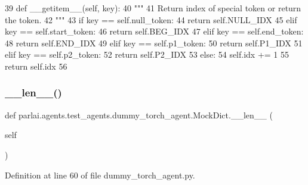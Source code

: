 \begin{DoxyCode}
39     \textcolor{keyword}{def }\_\_getitem\_\_(self, key):
40         \textcolor{stringliteral}{"""}
41 \textcolor{stringliteral}{        Return index of special token or return the token.}
42 \textcolor{stringliteral}{        """}
43         \textcolor{keywordflow}{if} key == self.null\_token:
44             \textcolor{keywordflow}{return} self.NULL\_IDX
45         \textcolor{keywordflow}{elif} key == self.start\_token:
46             \textcolor{keywordflow}{return} self.BEG\_IDX
47         \textcolor{keywordflow}{elif} key == self.end\_token:
48             \textcolor{keywordflow}{return} self.END\_IDX
49         \textcolor{keywordflow}{elif} key == self.p1\_token:
50             \textcolor{keywordflow}{return} self.P1\_IDX
51         \textcolor{keywordflow}{elif} key == self.p2\_token:
52             \textcolor{keywordflow}{return} self.P2\_IDX
53         \textcolor{keywordflow}{else}:
54             self.idx += 1
55             \textcolor{keywordflow}{return} self.idx
56 
\end{DoxyCode}
\mbox{\label{classparlai_1_1agents_1_1test__agents_1_1dummy__torch__agent_1_1MockDict_ae129f36493047793b249c2c4c2432df2}} 
\subsubsection{\texorpdfstring{\+\_\+\+\_\+len\+\_\+\+\_\+()}{\_\_len\_\_()}}
{\footnotesize\ttfamily def parlai.\+agents.\+test\+\_\+agents.\+dummy\+\_\+torch\+\_\+agent.\+Mock\+Dict.\+\_\+\+\_\+len\+\_\+\+\_\+ (\begin{DoxyParamCaption}\item[{}]{self }\end{DoxyParamCaption})}



Definition at line 60 of file dummy\+\_\+torch\+\_\+agent.\+py.


